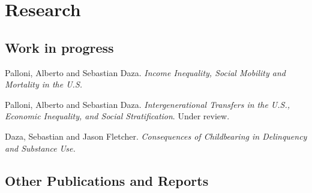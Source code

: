 \documentclass[10pt,letterpaper]{article}
\renewenvironment{itemize}{
  \begin{list}{}{
    \setlength{\leftmargin}{1.5em}
    \setlength{\itemsep}{0.25em}
    \setlength{\parskip}{0pt}
    \setlength{\parsep}{0.25em}
  }
}{
  \end{list}
}
\begin{document}
\section*{Research}

\subsection*{Work in progress}

\begin{itemize}

\item Palloni, Alberto and Sebastian Daza. {\textit{Income Inequality, Social Mobility and Mortality in the U.S.}}

\item Palloni, Alberto and Sebastian Daza. {\textit{Intergenerational Transfers in the U.S., Economic Inequality, and Social Stratification}}.
Under review.



\item Daza, Sebastian and Jason Fletcher. {\textit{Consequences of Childbearing in Delinquency and Substance Use.}}
\end{itemize}


\subsection*{Other Publications and Reports}
\end{document}
